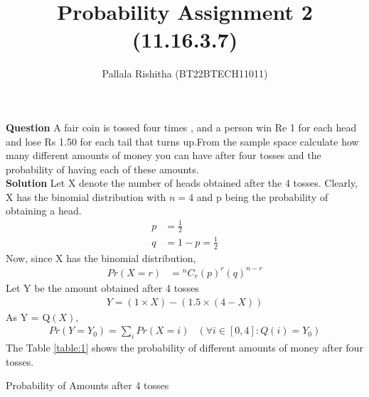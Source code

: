\documentclass[12pt,onecolumn,notitlepage]{article}
\title{Probability Assignment 2 (11.16.3.7)}
\author{Pallala Rishitha (BT22BTECH11011)}
\date{}
\providecommand{\brak}[1]{\ensuremath{\left(#1\right)}}
\newcommand*{\comb}[2]{{}^{#1}C_{#2}}
\begin{document}
\maketitle
\textbf{Question}
A fair coin is tossed four times , and a person win Re 1 for each head and lose Rs 1.50 for each tail that turns up.From the sample space calculate how many different amounts of money you can have after four tosses and the
probability of having each of these amounts. \\
\textbf{Solution}
Let X denote the number of heads obtained after the 4 tosses. Clearly, X has the binomial distribution with $n=4$ and p being the probability of obtaining a head.
\begin{align}
    p &= \frac{1}{2} \\ 
    q &=1-p = \frac{1}{2}     
\end{align}
Now, since X has the binomial distribution,
\begin{align}
 Pr\brak{X=r} &= \comb{n}{r}\brak{p}^{r}\brak{q}^{n-r} 
\end{align}
Let Y be the amount obtained after 4 tosses
\begin{align}
    Y= (1\times X) - (1.5\times(4-X))
\end{align}
As Y = Q\brak{X},
\begin{align}
  Pr\brak{Y=Y_0} = \sum_i Pr\brak{X=i} &\brak{\forall i\in [0,4]:Q\brak{i}=Y_0} 
 \end{align}
The Table \ref{table:1} shows the probability of different amounts of money after four tosses.
 \setlength{\tabcolsep}{18pt}
 \renewcommand{\arraystretch}{2.15}
\begin{table}
\centering

\caption{Probability of Amounts after 4 tosses}
\label{table:1}

\end{table}
\end{document}

